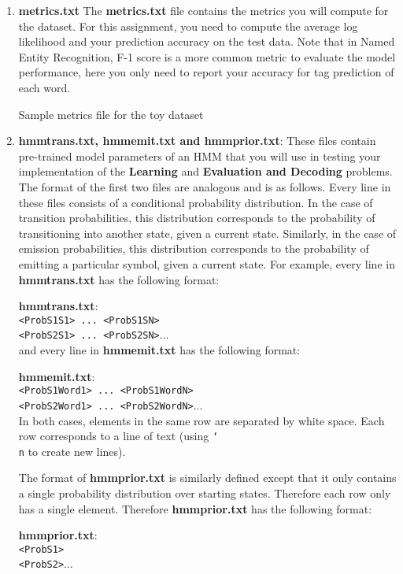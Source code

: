 \documentclass[11pt,addpoints,answers]{exam}
\numberwithin{equation}{section} %
\numberwithin{figure}{section} %
\numberwithin{table}{section} %
\begin{document}
\begin{enumerate}
\item \textbf{metrics.txt} The \textbf{metrics.txt} file contains the metrics you will compute for the dataset. For this assignment, you need to compute the average log likelihood and your prediction accuracy on the test data. Note that in Named Entity Recognition, F-1 score is a more common metric to evaluate the model performance, here you only need to report your accuracy for tag prediction of each word. 

Sample metrics file for the toy dataset


\item \textbf{hmmtrans.txt, hmmemit.txt and hmmprior.txt}: These files contain pre-trained model parameters of an HMM that you will use in testing your implementation of the \textbf{Learning} and \textbf{Evaluation and Decoding} problems. The format of the first two files are analogous and is as follows. Every line in these files consists of a conditional probability distribution. In the case of transition probabilities, this distribution corresponds to the probability of transitioning into another state, given a current state. Similarly, in the case of emission probabilities, this distribution corresponds to the probability of emitting a particular symbol, given a current state. For example, every line in \textbf{hmmtrans.txt} has the following format:
    
    \textbf{hmmtrans.txt}:\\
    \texttt{<ProbS1S1> ... <ProbS1SN>}\\
     \texttt{<ProbS2S1> ... <ProbS2SN>}...\\   
    
and every line in \textbf{hmmemit.txt} has the following format:
    
    \textbf{hmmemit.txt}:\\
    \texttt{<ProbS1Word1> ... <ProbS1WordN>}\\
     \texttt{<ProbS2Word1> ... <ProbS2WordN>}...\\
    
In both cases, elements in the same row are separated by white space. Each row corresponds to a line of text (using \texttt{\char`\\ n} to create new lines).
    
    
The format of \textbf{hmmprior.txt} is similarly defined except that it only contains a single probability distribution over starting states. Therefore each row only has a single element. Therefore \textbf{hmmprior.txt} has the following format:
    
    \textbf{hmmprior.txt}:\\
    \texttt{<ProbS1>}\\
     \texttt{<ProbS2>}...\\

\end{enumerate}
\end{document}

